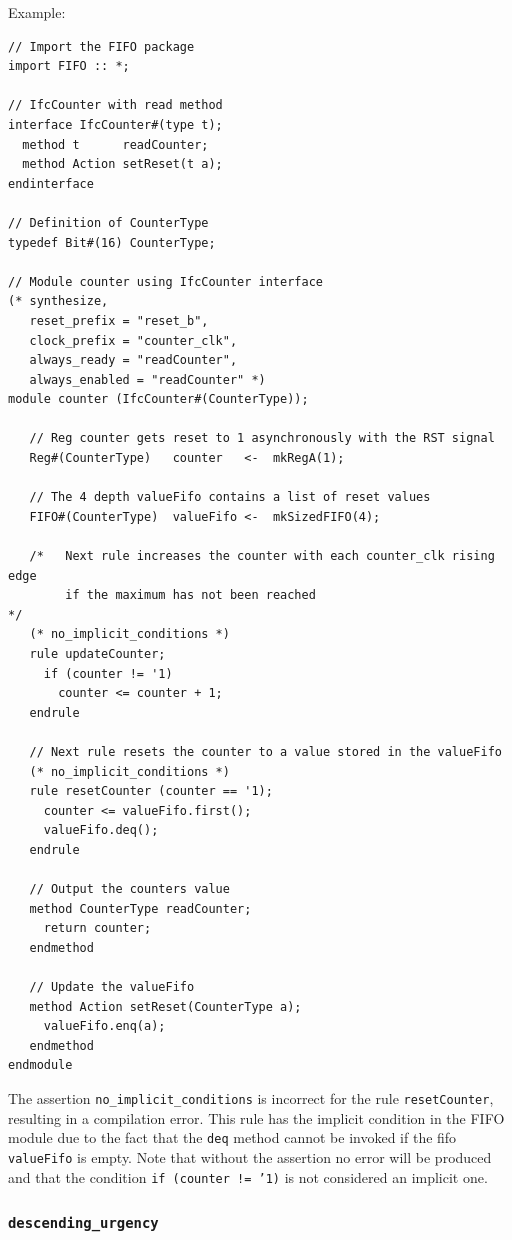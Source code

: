 \documentclass[twoside,letterpaper]{article}
\newcommand{\te}[1]{\texttt{#1}}
\begin{document}
Example:
\begin{verbatim}
// Import the FIFO package
import FIFO :: *;

// IfcCounter with read method
interface IfcCounter#(type t);
  method t      readCounter;
  method Action setReset(t a);
endinterface

// Definition of CounterType
typedef Bit#(16) CounterType;

// Module counter using IfcCounter interface
(* synthesize,
   reset_prefix = "reset_b",
   clock_prefix = "counter_clk",
   always_ready = "readCounter",
   always_enabled = "readCounter" *)
module counter (IfcCounter#(CounterType));

   // Reg counter gets reset to 1 asynchronously with the RST signal         
   Reg#(CounterType)   counter   <-  mkRegA(1);

   // The 4 depth valueFifo contains a list of reset values
   FIFO#(CounterType)  valueFifo <-  mkSizedFIFO(4);

   /*   Next rule increases the counter with each counter_clk rising edge
        if the maximum has not been reached                               */
   (* no_implicit_conditions *)
   rule updateCounter;
     if (counter != '1)
       counter <= counter + 1;
   endrule

   // Next rule resets the counter to a value stored in the valueFifo
   (* no_implicit_conditions *)
   rule resetCounter (counter == '1);
     counter <= valueFifo.first();
     valueFifo.deq();
   endrule

   // Output the counters value
   method CounterType readCounter;
     return counter;
   endmethod 

   // Update the valueFifo
   method Action setReset(CounterType a);
     valueFifo.enq(a);
   endmethod  
endmodule
\end{verbatim}
The assertion \te{no\_implicit\_conditions} is incorrect for the rule
\te{resetCounter}, resulting in a compilation error. This rule has the
implicit condition in the FIFO module due to the fact that the \te{deq}
method  cannot be invoked if the fifo \te{valueFifo} is empty. 
Note  that without the assertion no error will be produced and that
the condition \te{if (counter != '1)} is not considered an implicit one.


\subsubsection{ \te{descending\_urgency}}
\end{document}

